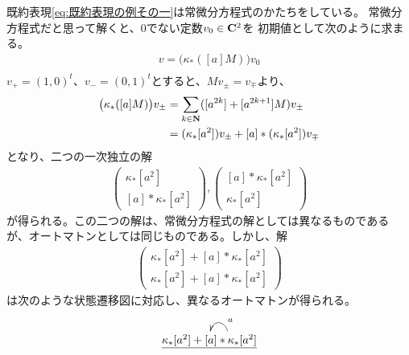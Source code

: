 		既約表現\eqref{eq:既約表現の例その一}は常微分方程式のかたちをしている。
		常微分方程式だと思って解くと、$0$でない定数$v_0\in {\mathbf{C}}^2$を
		初期値として次のように求まる。
		\begin{equation*}\begin{split} %
			v = \bigl(\kappa_*([a]M)\bigr)v_0 \\
		\end{split}\end{equation*} %
		$v_+=(1,0)^t$、$v_-=(0,1)^t$とすると、$Mv_\pm=v_\mp$より、
		\begin{equation*}\begin{split} %
			\bigl(\kappa_*([a]M)\bigr)v_\pm
			&= \sum_{k\in\mybf{N}}([a^{2k}]+[a^{2k+1}]M)v_\pm \\
			&= (\kappa_*[a^2])v_\pm + [a]*(\kappa_*[a^2])v_\mp \\
		\end{split}\end{equation*} %
		となり、二つの一次独立の解
		\begin{equation*}\begin{split} %
			\begin{pmatrix}
				\kappa_*[a^2] \\
				[a]*\kappa_*[a^2]
			\end{pmatrix},\begin{pmatrix}
				[a]*\kappa_*[a^2] \\
				\kappa_*[a^2]
			\end{pmatrix}
		\end{split}\end{equation*} %
		が得られる。この二つの解は、常微分方程式の解としては異なるものである
		が、オートマトンとしては同じものである。しかし、解
		\begin{equation*}\begin{split} %
			\begin{pmatrix}
				\kappa_*[a^2]+[a]*\kappa_*[a^2] \\
				\kappa_*[a^2]+[a]*\kappa_*[a^2]
			\end{pmatrix}
		\end{split}\end{equation*} %
		は次のような状態遷移図に対応し、異なるオートマトンが得られる。
		\begin{equation*}\xymatrix{
			\underline{\kappa_*[a^2]+[a]*\kappa_*[a^2]} \ar@(r,u)_{a} 
		}\end{equation*}

